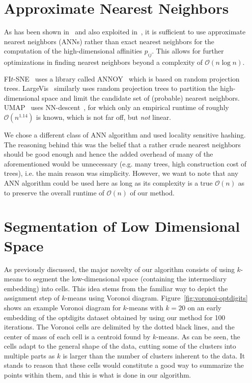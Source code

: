 \section{Approximate Nearest Neighbors}

As has been shown in~\cite{fitsne} and also exploited
in~\cite{largevis}, it is sufficient to use approximate nearest
neighbors (ANNs) rather than exact nearest neighbors for the computation
of the high-dimensional affinities $p_{ij}$. This allows for further
optimizations in finding nearest neighbors beyond a complexity
of $\mathcal{O}(n \log n)$.

FI$t$-SNE~\cite{fitsne} uses a library called ANNOY~\cite{annoy} which is based on random
projection trees. LargeVis~\cite{largevis} similarly uses random projection
trees to partition the high-dimensional space and limit the candidate set of
(probable) nearest neighbors. UMAP~\cite{umap} uses
NN-descent~\cite{nn_descent}, for which only an empirical runtime of roughly
$\mathcal{O}(n^{1.14})$ is known, which is not far off, but \emph{not} linear.

We chose a different class of ANN algorithm and used locality sensitive
hashing. The reasoning behind this was the belief that a rather crude nearest
neighbors should be good enough and hence the added overhead of many of the
aforementioned would be unnecessary (e.g. many trees, high construction cost of
trees), i.e. the main reason was simplicity. However, we want to note that any
ANN algorithm could be used here as long as its complexity is a true
$\mathcal{O}(n)$ as to preserve the overall runtime of $\mathcal{O}(n)$ of
our method.

\vfill

\section{Segmentation of Low Dimensional Space}

As previously discussed, the major novelty of our algorithm consists of using
$k$-means to segment the low-dimensional space (containing the intermediary
embedding) into cells. This idea stems from the familiar way to depict the
assignment step of $k$-means using Voronoi diagram.
Figure~\ref{fig:voronoi-optdigits} shows an example Voronoi diagram for
$k$-means with $k = 20$ on an early embedding of the optdigits dataset obtained
by using our method for 100 iterations. The Voronoi cells are delimited by the
dotted black lines, and the center of mass of each cell is a centroid found by
$k$-means. As can be seen, the cells adapt to the general shape of the data,
cutting some of the clusters into multiple parts as $k$ is larger than the
number of clusters inherent to the data. It stands to reason that these cells
would constitute a good way to summarize the points within them, and this is
what is done in our algorithm.


